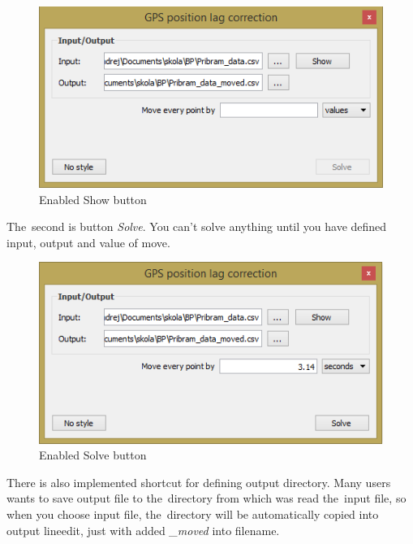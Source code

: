   \begin{figure}[H]
   \centering
	\includegraphics[scale=0.75]{./pictures/show.png}
	\caption[Enabled Show button]{Enabled Show button}
      \label{fig:show}
  \end{figure}

The~second is button \textit{Solve}. You can’t solve anything until you have defined input, output and
value of move.

  \begin{figure}[H]
   \centering
	\includegraphics[scale=0.75]{./pictures/solve.png}
	\caption[Enabled Solve button]{Enabled Solve button}
      \label{fig:solve}
  \end{figure}

There is also implemented shortcut for defining output directory. Many users wants to save output file to
the~directory from which was read the~input file, so when you choose input file, the~directory will
be automatically copied into output lineedit, just with added \textit{\_moved} into filename. 
